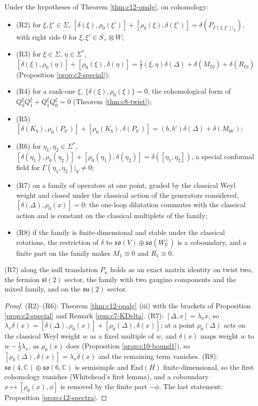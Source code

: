 \begin{corollary}
\label{cor:c12-rel}
Under the hypotheses of Theorem \ref{thm:c12-opalg}, on cohomology:
\begin{itemize}
\item (R2) for $\xi,\xi'\in\Sigma$, $[\delta(\xi),\rho_0(\xi')]+[\rho_0(\xi),\delta(\xi')]=\delta(P_{\Gamma(\xi,\xi')|_V})$, with right side $0$ for $\xi,\xi'\in S_+\otimes W$;
\item (R3) for $\xi\in\Sigma$, $\eta\in\Sigma^*$, $[\delta(\xi),\rho_0(\eta)]+[\rho_0(\xi),\delta(\eta)]=\tfrac12(\xi,\eta)\delta(\Delta)+\delta(M_{\xi\eta})+\delta(R_{\xi\eta})$ (Proposition \ref{prop:c2-special});
\item (R4) for a rank-one $\xi$, $\{\delta(\xi),\rho_0(\xi)\}=0$, the cohomological form of $Q^\xi_0Q^\xi_1+Q^\xi_1Q^\xi_0=0$ (Theorem \ref{thm:c8-twist});
\item (R5) $[\delta(K_b),\rho_0(P_{b'})]+[\rho_0(K_b),\delta(P_{b'})]=(b,b')\delta(\Delta)+\delta(M_{bb'})$;
\item (R6) for $\eta_1,\eta_2\in\Sigma^*$, $[\delta(\eta_1),\rho_0(\eta_2)]+[\rho_0(\eta_1),\delta(\eta_2)]=\delta([\eta_1,\eta_2])$, a special conformal field for $\Gamma(\eta_1,\eta_2)|_V\neq0$;
\item (R7) on a family of operators at one point, graded by the classical Weyl weight and closed under the classical action of the generators considered, $[\delta(\Delta),\rho_0(x)]=0$: the one-loop dilatation commutes with the classical action and is constant on the classical multiplets of the family;
\item (R8) if the family is finite-dimensional and stable under the classical rotations, the restriction of $\delta$ to $\mathfrak{so}(V)\oplus\mathfrak{so}(W_{\mathbb R}^\perp)$ is a coboundary, and a finite part on the family makes $M_1\cong0$ and $R_1\cong0$.
\end{itemize}
(R7) along the null translation $P_n$ holds as an exact matrix identity on twist two, the fermion $\mathfrak{sl}(2)$ sector, the family with two gaugino components and the mixed family, and on the $\mathfrak{su}(2)$ sector.
\end{corollary}

\begin{proof}
(R2)--(R6): Theorem \ref{thm:c12-opalg} (iii) with the brackets of Proposition \ref{prop:c2-special} and Remark \ref{rem:c7-KDelta}. (R7): $[\Delta,x]=\lambda_xx$, so $\lambda_x\delta(x)=[\delta(\Delta),\rho_0(x)]+[\rho_0(\Delta),\delta(x)]$; at a point $\rho_0(\Delta)$ acts on the classical Weyl weight $w$ as a fixed multiple of $w$, and $\delta(x)$ maps weight $w$ to $w-\tfrac12\lambda_x$, as $\rho_0(x)$ does (Proposition \ref{prop:c10-bound1}), so $[\rho_0(\Delta),\delta(x)]=\lambda_x\delta(x)$ and the remaining term vanishes. (R8): $\mathfrak{so}(4,\mathbb C)\oplus\mathfrak{so}(6,\mathbb C)$ is semisimple and $\mathrm{End}(H)$ finite-dimensional, so the first cohomology vanishes (Whitehead's first lemma), and a coboundary $x\mapsto[\rho_0(x),\phi]$ is removed by the finite part $-\phi$. The last statement: Proposition \ref{prop:c12-spectra}.
\end{proof}

